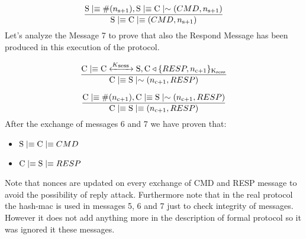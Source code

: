 \[ \frac{ \textnormal{S} \mid\equiv \#(n\textsubscript{s+1}), \textnormal{S} \mid\equiv \textnormal{C} \mid\sim (CMD,n\textsubscript{s+1}) } 
        {\textnormal{S} \mid\equiv \textnormal{C} \mid\equiv (CMD,n\textsubscript{s+1})}\]
Let's analyze the Message 7 to prove that also the Respond Message has been produced in this execution of the protocol.

\[ \frac{\textnormal{C} \mid\equiv \textnormal{C} \xleftrightarrow{K\textsubscript{sess }} \textnormal{S}, \textnormal{C} \triangleleft \lbrace RESP, n\textsubscript{c+1} \rbrace \textsubscript{K\textsubscript{sess}}}{ \textnormal{C} \mid\equiv \textnormal{S} \mid\sim (n\textsubscript{c+1},RESP)} 
\]

\[ \frac{\textnormal{C} \mid\equiv \#(n\textsubscript{c+1}), \textnormal{C} \mid\equiv \textnormal{S} \mid\sim (n\textsubscript{c+1},RESP) }{\textnormal{C} \mid\equiv \textnormal{S} \mid\equiv (n\textsubscript{c+1},RESP)}
\]
After the exchange of messages 6 and 7 we have proven that:
\begin{itemize}
	\item \( \textnormal{S} \mid\equiv \textnormal{C} \mid\equiv CMD\)
	\item \( \textnormal{C} \mid\equiv \textnormal{S} \mid\equiv RESP\)
\end{itemize}
Note that nonces are updated on every exchange of CMD and RESP message to avoid the possibility of reply attack. Furthermore note that in the real protocol the hash-mac is used in messages 5, 6 and 7 just to check integrity of messages. However it does not add anything more in the description of formal protocol so it was ignored it these messages.
